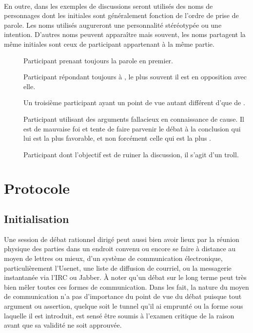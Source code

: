 \paragraph{}
En outre, dans les exemples de discussions seront utilisés des noms de personnages dont les initiales sont généralement fonction de l’ordre de prise de parole. Les noms utilisés augureront une personnalité stéréotypée ou une intention. D’autres noms peuvent apparaître mais souvent, les noms partagent la même initiales sont ceux de participant appartenant à la même partie.

\begin{description}
  \item[\A] Participant prenant toujours la parole en premier.
  \item[\B] Participant répondant toujours à \A, le plus souvent il est en opposition avec elle.
  \item[\C] Un troisième participant ayant un point de vue autant différent d’\A que de \B.
  \item[\Sophist] Participant utilisant des arguments fallacieux en connaissance de cause. Il est de mauvaise foi et tente de faire parvenir le débat à la conclusion qui lui est la plus favorable, et non forcément celle qui est la plus .
  \item[\Troll] Participant dont l’objectif est de ruiner la discussion, il s’agit d’un troll.
\end{description}

\section{Protocole}
\subsection{Initialisation}
Une session de débat rationnel dirigé peut aussi bien avoir lieux par la réunion physique des parties dans un endroit convenu ou encore se faire à distance au moyen de lettres ou mieux, d’un système de communication électronique, particulièrement l’Usenet, une liste de diffusion de courriel, ou la messagerie instantanée via l’IRC ou Jabber. À noter qu’un débat sur le long terme peut très bien mêler toutes ces formes de communication. Dans les fait, la nature du moyen de communication n’a pas d’importance du point de vue du débat puisque tout argument ou assertion, quelque soit le tunnel qu’il ai emprunté ou la forme sous laquelle il est introduit, est sensé être soumis à l’examen critique de la raison avant que sa validité ne soit approuvée.

